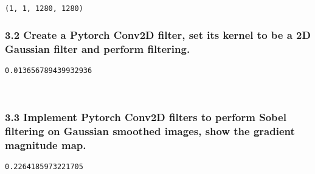 \documentclass[11pt]{article}
\begin{document}
    \begin{Verbatim}[commandchars=\\\{\}]
(1, 1, 1280, 1280)
    \end{Verbatim}

    \hypertarget{create-a-pytorch-conv2d-filter-set-its-kernel-to-be-a-2d-gaussian-filter-and-perform-filtering.}{%
\subsubsection{3.2 Create a Pytorch Conv2D filter, set its kernel to be
a 2D Gaussian filter and perform
filtering.}\label{create-a-pytorch-conv2d-filter-set-its-kernel-to-be-a-2d-gaussian-filter-and-perform-filtering.}}

    \begin{Verbatim}[commandchars=\\\{\}]
0.013656789439932936
    \end{Verbatim}

    \begin{center}
    \end{center}
    { \hspace*{\fill} \\}
    
    \hypertarget{implement-pytorch-conv2d-filters-to-perform-sobel-filtering-on-gaussian-smoothed-images-show-the-gradient-magnitude-map.}{%
\subsubsection{3.3 Implement Pytorch Conv2D filters to perform Sobel
filtering on Gaussian smoothed images, show the gradient magnitude
map.}\label{implement-pytorch-conv2d-filters-to-perform-sobel-filtering-on-gaussian-smoothed-images-show-the-gradient-magnitude-map.}}

    \begin{Verbatim}[commandchars=\\\{\}]
0.2264185973221705
    \end{Verbatim}

    \begin{center}
    \end{center}
    { \hspace*{\fill} \\}
    

    
    
    
\end{document}
